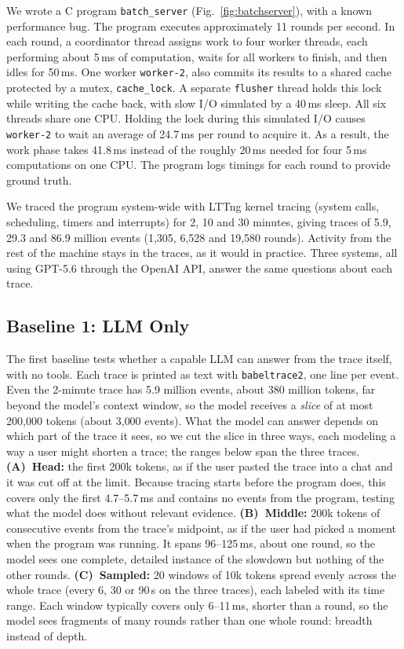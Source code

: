 \documentclass[10pt,conference]{IEEEtran}
\begin{document}
We wrote a C program \texttt{batch\_server} (Fig.~\ref{fig:batchserver}), with a known performance bug. The program executes approximately 11 rounds per second. In each round, a coordinator thread assigns work to four worker threads, each performing about 5\,ms of computation, waits for all workers to finish, and then idles for 50\,ms. One worker \texttt{worker-2}, also commits its results to a shared cache protected by a mutex, \texttt{cache\_lock}. A separate \texttt{flusher} thread holds this lock while writing the cache back, with slow I/O simulated by a 40\,ms sleep. All six threads share one CPU. Holding the lock during this simulated I/O causes \texttt{worker-2} to wait an average of 24.7\,ms per round to acquire it. As a result, the work phase takes 41.8\,ms instead of the roughly 20\,ms needed for four 5\,ms computations on one CPU. The program logs timings for each round to provide ground truth.

We traced the program system-wide with LTTng kernel tracing (system calls, scheduling, timers and interrupts) for 2, 10 and 30 minutes, giving traces of  5.9, 29.3 and 86.9 million events (1{,}305, 6{,}528 and 19{,}580 rounds). Activity from the rest of the machine stays in the traces, as it would in practice. Three systems, all using GPT-5.6 through the OpenAI API, answer the same questions about each trace.

\subsection{Baseline 1: LLM Only}

The first baseline tests whether a capable LLM can answer from the trace itself, with no tools. Each trace is printed as text with \texttt{babeltrace2}, one line per event. Even the 2-minute trace has 5.9 million events, about 380 million tokens, far beyond the model's context window, so the model receives a \emph{slice} of at most 200{,}000 tokens (about 3{,}000 events). What the model can answer depends on which part of the trace it sees, so we cut the slice in three ways, each modeling a way a user might shorten a trace; the ranges below span the three traces. \textbf{(A)~Head:} the first 200k tokens, as if the user pasted the trace into a chat and it was cut off at the limit. Because tracing starts before the program does, this covers only the first 4.7--5.7\,ms and contains no events from the program, testing what the model does without relevant evidence. \textbf{(B)~Middle:} 200k tokens of consecutive events from the trace's midpoint, as if the user had picked a moment when the program was running. It spans 96--125\,ms, about one round, so the model sees one complete, detailed instance of the slowdown but nothing of the other rounds. \textbf{(C)~Sampled:} 20 windows of 10k tokens spread evenly across the whole trace (every 6, 30 or 90\,s on the three traces), each labeled with its time range. Each window typically covers only 6--11\,ms, shorter than a round, so the model sees fragments of many rounds rather than one whole round: breadth instead of depth.
\end{document}
